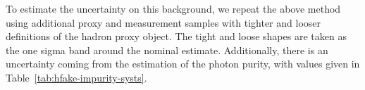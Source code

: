 To estimate the uncertainty on this background, we repeat the above method using additional proxy and measurement samples with tighter and looser definitions of the hadron proxy object.
The tight and loose shapes are taken as the one sigma band around the nominal estimate. 
Additionally, there is an uncertainty coming from the estimation of the photon purity, with values given in Table~\ref{tab:hfake-impurity-systs}. 
